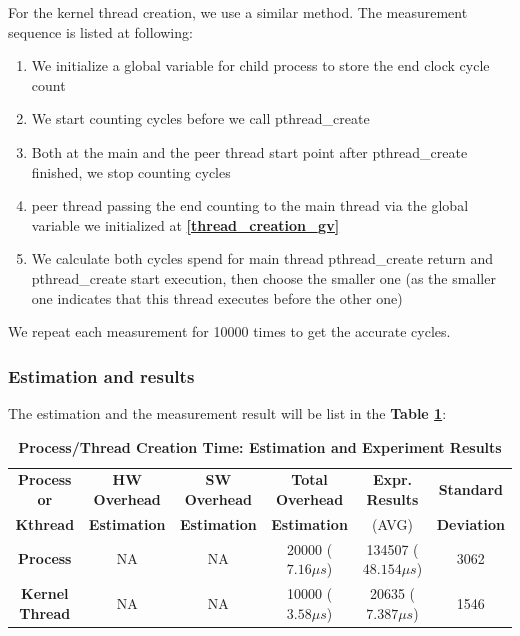 For the kernel thread creation, we use a similar method. The measurement sequence is listed at following:
\begin{enumerate}
    \item We initialize a global variable for child process to store the end clock cycle count \label{thread_creation_gv}
    \item We start counting cycles before we call pthread\_create
    \item Both at the main and the peer thread start point after pthread\_create finished, we stop counting cycles
    \item peer thread passing the end counting to the main thread via the global variable we initialized at \textbf{\ref{thread_creation_gv}}
    \item We calculate both cycles spend for main thread pthread\_create return and pthread\_create start execution, then choose the smaller one (as the smaller one indicates that this thread executes before the other one)
\end{enumerate}

We repeat each measurement for 10000 times to get the accurate cycles.

\subsubsection{Estimation and results}

The estimation and the measurement result will be list in the \textbf{Table \ref{process_creation_time}}:

\begin{table}[ht]
  \centering
  \caption{\textbf{Process/Thread Creation Time: Estimation and Experiment Results}}
  \hspace*{-2em}\begin{threeparttable}
  \begin{tabular}{cccccc}
  \hline
      \textbf{Process or} & \textbf{HW Overhead} & \textbf{SW Overhead } & \textbf{Total Overhead} & \textbf{Expr. Results} & \textbf{Standard}\\
      \textbf{Kthread} & \textbf{Estimation}       &  \textbf{Estimation}         & \textbf{Estimation}  & (AVG)   & \textbf{Deviation} \\
  \hline
      \textbf{Process} & NA & NA & 20000 ($7.16 \mu s$) & 134507 ($48.154 \mu s$) & 3062 \\
      \textbf{Kernel Thread} & NA & NA & 10000 ($3.58 \mu s$) & 20635 ($7.387 \mu s$)  & 1546 \\
  \hline
  \end{tabular}
  \end{threeparttable}
  \label{process_creation_time}
\end{table}

